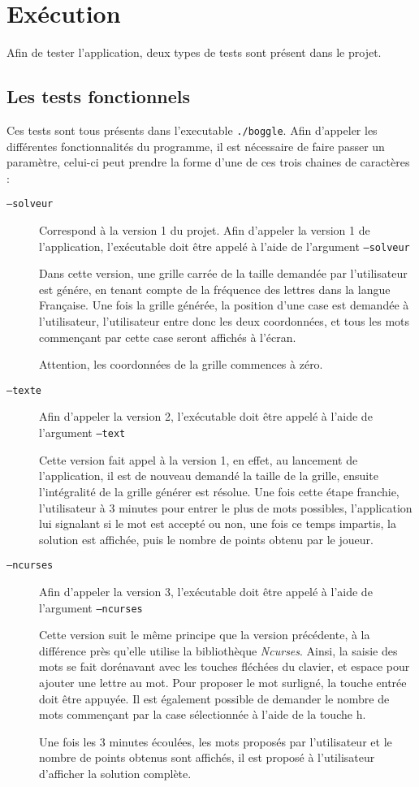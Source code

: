 \documentclass[12pt,a4paper,openany]{article}
\begin{document}
	\section{Exécution}
	Afin de tester l'application, deux types de tests sont présent dans le projet.

		\subsection{Les tests fonctionnels} Ces tests sont tous présents dans l'executable
			\texttt{./boggle}. Afin d'appeler les différentes fonctionnalités du programme, il
			est nécessaire de faire passer un paramètre, celui-ci peut prendre la forme d'une
			de ces trois chaines de caractères : 
			\begin{description}
				\item[\texttt{--solveur}] Correspond à la version 1 du projet.
Afin d'appeler la version 1 de l'application, l'exécutable doit être appelé à l'aide de
l'argument \texttt{--solveur}

Dans cette version, une grille carrée de la taille demandée par l'utilisateur est génére, en
tenant compte de la fréquence des lettres dans la langue Française. Une fois la grille
générée, la position d'une case est demandée à l'utilisateur, l'utilisateur entre donc les
deux coordonnées, et tous les mots commençant par cette case seront affichés à l'écran.

Attention, les coordonnées de la grille commences à zéro.
				\item[\texttt{--texte}]
					Afin d'appeler la version 2, l'exécutable doit être appelé à l'aide de
					l'argument \texttt{--text}

					Cette version fait appel à la version 1, en effet, au lancement de
					l'application, il est de nouveau demandé la taille de la grille, ensuite
					l'intégralité de la grille générer est résolue. Une fois cette étape
					franchie, l'utilisateur à 3 minutes pour entrer le plus de mots possibles,
					l'application lui signalant si le mot est accepté ou non, une fois ce
					temps impartis, la solution est affichée, puis le nombre de points obtenu
					par le joueur.
				\item[\texttt{--ncurses}]
					Afin d'appeler la version 3, l'exécutable doit être appelé à l'aide de
					l'argument \texttt{--ncurses}

					Cette version suit le même principe que la version précédente, à la
					différence près qu'elle utilise la bibliothèque \textit{Ncurses}. Ainsi, la saisie
					des mots se fait dorénavant avec les touches fléchées du clavier, et
					espace pour ajouter une lettre au mot. Pour proposer le mot surligné, la
					touche entrée doit être appuyée. Il est également possible de demander le
					nombre de mots commençant par la case sélectionnée à l'aide de la touche
					h.

					Une fois les 3 minutes écoulées, les mots proposés par l'utilisateur et le
					nombre de points obtenus sont affichés, il est proposé à l'utilisateur
					d'afficher la solution complète. 
			\end{description}
\end{document}
